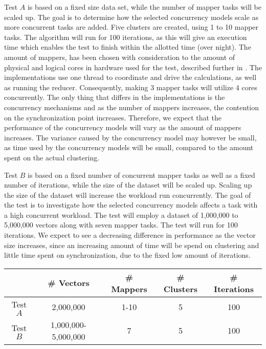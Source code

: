Test $A$ is based on a fixed size data set, while the number of mapper tasks will be scaled up. The goal is to determine how the selected concurrency models scale as more concurrent tasks are added. Five clusters are created, using 1 to 10 mapper tasks. The algorithm will run for 100 iterations, as this will give an execution time which enables the test to finish within the allotted time (over night). The amount of mappers, has been chosen with consideration to the amount of physical and logical cores in hardware used for the test, described further in . The implementations use one thread to coordinate and drive the calculations, as well as running the reducer. Consequently, making 3 mapper tasks will utilize 4 cores concurrently. The only thing that differs in the implementations is the concurrency mechanisms and as the number of mappers increases, the contention on the synchronization point increases. Therefore, we expect that the performance of the concurrency models will vary as the amount of mappers increases. The variance caused by the concurrency model may however be small, as time used by the concurrency models will be small, compared to the amount spent on the actual clustering. 

Test $B$ is based on a fixed number of concurrent mapper tasks as well as a fixed number of iterations, while the size of the dataset will be scaled up. Scaling up the size of the dataset will increase the workload run concurrently. The goal of the test is to investigate how the selected concurrency models affects a task with a high concurrent workload. The test will employ a dataset of 1,000,000 to 5,000,000 vectors along with seven mapper tasks. The test will run for 100 iterations. We expect to see a decreasing difference in performance as the vector size increases, since an increasing amount of time will be spend on clustering and little time spent on synchronization, due to the fixed low amount of iterations.

\begin{center}
\begin{table}[h]
\centering
\begin{tabular}{c|cccc}
       & \# Vectors        & \# Mappers			 	& \# Clusters & \# Iterations \\ \hline
Test $A$ & 2,000,000            & 1-10        			& 5           & 100      \\
Test $B$ & 1,000,000-5,000,000  & 7          			& 5           & 100
\end{tabular}
\end{table}
 \label{tab:test_description_work_intensive} 
\end{center}

